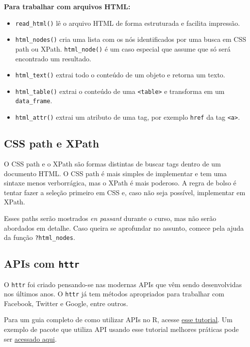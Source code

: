\documentclass[]{book}
\providecommand{\tightlist}{%
  \setlength{\itemsep}{0pt}\setlength{\parskip}{0pt}}
\begin{document}
\textbf{Para trabalhar com arquivos HTML:}

\begin{itemize}
\tightlist
\item
  \texttt{read\_html()} lê o arquivo HTML de forma estruturada e
  facilita impressão.
\item
  \texttt{html\_nodes()} cria uma lista com os nós identificados por uma
  busca em CSS path ou XPath. \texttt{html\_node()} é um caso especial
  que assume que só será encontrado um resultado.
\item
  \texttt{html\_text()} extrai todo o conteúdo de um objeto e retorna um
  texto.
\item
  \texttt{html\_table()} extrai o conteúdo de uma
  \texttt{\textless{}table\textgreater{}} e transforma em um
  \texttt{data\_frame}.
\item
  \texttt{html\_attr()} extrai um atributo de uma tag, por exemplo
  \texttt{href} da tag \texttt{\textless{}a\textgreater{}}.
\end{itemize}

\subsection{CSS path e XPath}\label{css-path-e-xpath}

O CSS path e o XPath são formas distintas de buscar tags dentro de um
documento HTML. O CSS path é mais simples de implementar e tem uma
sintaxe menos verborrágica, mas o XPath é mais poderoso. A regra de
bolso é tentar fazer a seleção primeiro em CSS e, caso não seja
possível, implementar em XPath.

Esses paths serão mostrados \emph{en passant} durante o curso, mas não
serão abordados em detalhe. Caso queira se aprofundar no assunto, comece
pela ajuda da função \texttt{?html\_nodes}.

\subsection{\texorpdfstring{APIs com
\texttt{httr}}{APIs com httr}}\label{apis-com-httr}

O \texttt{httr} foi criado pensando-se nas modernas APIs que vêm sendo
desenvolvidas nos últimos anos. O \texttt{httr} já tem métodos
apropriados para trabalhar com Facebook, Twitter e Google, entre outros.

Para um guia completo de como utilizar APIs no R, acesse
\href{https://cran.r-project.org/web/packages/httr/vignettes/api-packages.html}{esse
tutorial}. Um exemplo de pacote que utiliza API usando esse tutorial
melhores práticas pode ser
\href{https://github.com/jtrecenti/sptrans}{acessado aqui}.
\end{document}

